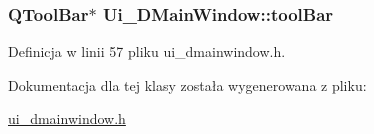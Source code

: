 \subsubsection[{tool\+Bar}]{\setlength{\rightskip}{0pt plus 5cm}Q\+Tool\+Bar$\ast$ Ui\+\_\+\+D\+Main\+Window\+::tool\+Bar}\label{class_ui___d_main_window_abba1dae1dd835c7a7dd39da623cd4580}


Definicja w linii 57 pliku ui\+\_\+dmainwindow.\+h.



Dokumentacja dla tej klasy została wygenerowana z pliku\+:\begin{DoxyCompactItemize}
\item 
\hyperlink{ui__dmainwindow_8h}{ui\+\_\+dmainwindow.\+h}\end{DoxyCompactItemize}
